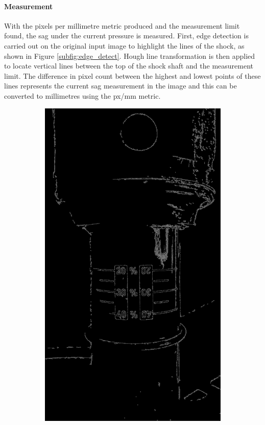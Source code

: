 		\paragraph{Measurement}
			With the pixels per millimetre metric produced and the measurement limit found, the sag under the current pressure is measured. First, edge detection is carried out on the original input image to highlight the lines of the shock, as  shown in Figure \ref{subfig:edge_detect}. Hough line transformation is then applied to locate vertical lines between the top of the shock shaft and the measurement limit. The difference in pixel count between the highest and lowest points of these lines represents  the current sag measurement in the image and this can be converted to millimetres using the px/mm metric.
			\begin{figure}[h!]
				\centering
				\begin{subfigure}[t]{0.4\textwidth}
					\centering
					\includegraphics[scale=0.04]{../images/results/edged.jpg}

\end{subfigure}
\end{figure}
